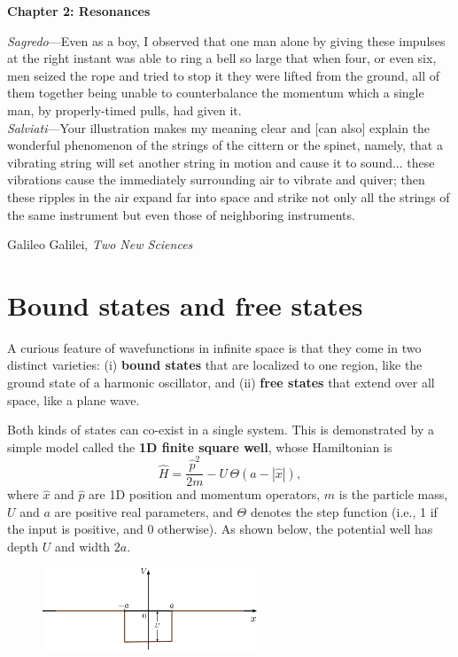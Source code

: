 \documentclass[pra,12pt]{revtex4-2}
\begin{document}
\setcounter{page}{18}

\setlength{\epigraphwidth}{0.7\textwidth}

\begin{center}
{\Large \textbf{Chapter 2: Resonances}}
\end{center}

\epigraph{
\textit{Sagredo}---Even as a boy, I observed that one man alone by giving these impulses at the right instant was able to ring a bell so large that when four, or even six, men seized the rope and tried to stop it they were lifted from the ground, all of them together being unable to counterbalance the momentum which a single man, by properly-timed pulls, had given it. \\ \vskip0.1in
\textit{Salviati}---Your illustration makes my meaning clear and [can also] explain the wonderful phenomenon of the strings of the cittern or the spinet, namely, that a vibrating string will set another string in motion and cause it to sound... these vibrations cause the immediately surrounding air to vibrate and quiver; then these ripples in the air expand far into space and strike not only all the strings of the same instrument but even those of neighboring instruments.}{Galileo Galilei, \textit{Two New Sciences}}

\section{Bound states and free states}

A curious feature of wavefunctions in infinite space is that they come
in two distinct varieties: (i) \textbf{bound states} that are
localized to one region, like the ground state of a harmonic
oscillator, and (ii) \textbf{free states} that extend over all space,
like a plane wave.

Both kinds of states can co-exist in a single system.  This is
demonstrated by a simple model called the \textbf{1D finite square
  well}, whose Hamiltonian is
\begin{equation}
  \hat{H} = \frac{\hat{p}^2}{2m} - U \,\Theta(a -|\hat{x}|),
\end{equation}
where $\hat{x}$ and $\hat{p}$ are 1D position and momentum operators,
$m$ is the particle mass, $U$ and $a$ are positive real parameters,
and $\Theta$ denotes the step function (i.e., 1 if the input is
positive, and 0 otherwise).  As shown below, the potential well has
depth $U$ and width $2a$.

\begin{figure}[h]
  \centering\includegraphics[width=0.57\textwidth]{squarewell}
\end{figure}
\end{document}
